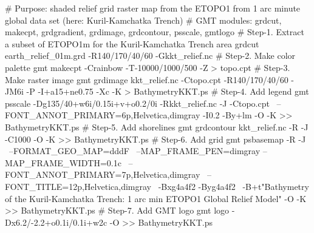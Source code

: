 # Purpose: shaded relief grid raster map from the ETOPO1 from 1 arc minute global data set (here: Kuril-Kamchatka Trench)
# GMT modules: grdcut, makecpt, grdgradient, grdimage, grdcontour, psscale, gmtlogo
# Step-1. Extract a subset of ETOPO1m for the Kuril-Kamchatka Trench area 
grdcut earth_relief_01m.grd -R140/170/40/60 -Gkkt_relief.nc
# Step-2. Make color palette 
gmt makecpt -Crainbow -T-10000/1000/500 -Z > topo.cpt
# Step-3. Make raster image
gmt grdimage kkt_relief.nc -Ctopo.cpt -R140/170/40/60 -JM6i -P -I+a15+ne0.75 -Xc -K > BathymetryKKT.ps
# Step-4. Add legend
gmt psscale -Dg135/40+w6i/0.15i+v+o0.2/0i -Rkkt_relief.nc -J -Ctopo.cpt \
	--FONT_ANNOT_PRIMARY=6p,Helvetica,dimgray -I0.2 -By+lm -O -K >> BathymetryKKT.ps	
# Step-5. Add shorelines
gmt grdcontour kkt_relief.nc -R -J -C1000 -O -K >> BathymetryKKT.ps
# Step-6. Add grid
gmt psbasemap -R -J \
	--FORMAT_GEO_MAP=dddF \
	--MAP_FRAME_PEN=dimgray --MAP_FRAME_WIDTH=0.1c \
	--FONT_ANNOT_PRIMARY=7p,Helvetica,dimgray \
	--FONT_TITLE=12p,Helvetica,dimgray \
	-Bxg4a4f2 -Byg4a4f2 \
	-B+t"Bathymetry of the Kuril-Kamchatka Trench: 1 arc min ETOPO1 Global Relief Model" -O -K >> BathymetryKKT.ps
# Step-7. Add GMT logo
gmt logo -Dx6.2/-2.2+o0.1i/0.1i+w2c -O >> BathymetryKKT.ps